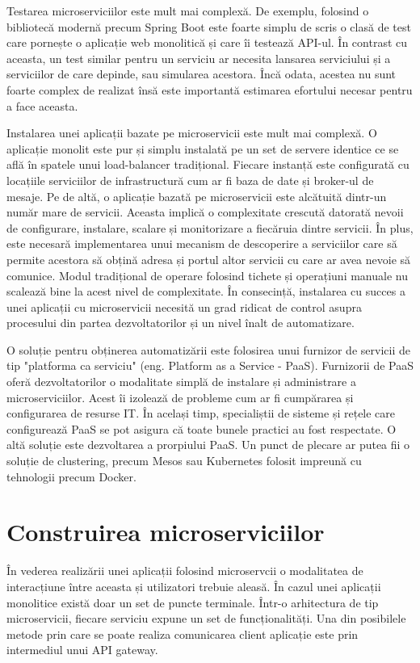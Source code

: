 \documentclass[12pt, a4paper, oneside, romanian]{teza-upb}
\begin{document}
Testarea microserviciilor este mult mai complexă. De exemplu, folosind o bibliotecă modernă precum Spring Boot este foarte simplu de scris o clasă de test care pornește o aplicație web monolitică și care îi testează API-ul. În contrast cu aceasta, un test similar pentru un serviciu ar necesita lansarea serviciului și a serviciilor de care depinde, sau simularea acestora. Încă odata, acestea nu sunt foarte complex de realizat însă este importantă estimarea efortului necesar pentru a face aceasta. 

Instalarea unei aplicații bazate pe microservicii este mult mai complexă. O aplicație monolit este pur și simplu instalată pe un set de servere identice ce se află în spatele unui load-balancer tradițional. Fiecare instanță este configurată cu locațiile serviciilor de infrastructură cum ar fi baza de date și broker-ul de mesaje. Pe de altă, o aplicație bazată pe microservicii este alcătuită dintr-un număr mare de servicii. Aceasta implică o complexitate crescută datorată nevoii de configurare, instalare, scalare și monitorizare a fiecăruia dintre servicii. În plus, este necesară implementarea unui mecanism de descoperire a serviciilor care să permite acestora să obțină adresa și portul altor servicii cu care ar avea nevoie să comunice. Modul tradițional de operare folosind tichete și operațiuni manuale nu scalează bine la acest nivel de complexitate. În consecință, instalarea cu succes a unei aplicații cu microservicii necesită un grad ridicat de control asupra procesului din partea dezvoltatorilor și un nivel înalt de automatizare. 

O soluție pentru obținerea automatizării este folosirea unui furnizor de servicii de tip "platforma ca serviciu" (eng. Platform as a Service - PaaS). Furnizorii de PaaS oferă dezvoltatorilor o modalitate simplă de instalare și administrare a microserviciilor. Acest îi izolează de probleme cum ar fi cumpărarea și configurarea de resurse IT. În același timp, specialiștii de sisteme și rețele care configurează PaaS se pot asigura că toate bunele practici au fost respectate. O altă soluție este dezvoltarea a prorpiului PaaS. Un punct de plecare ar putea fii o soluție de clustering, precum Mesos sau Kubernetes folosit impreună cu tehnologii precum Docker. 


\section{Construirea microserviciilor}

În vederea realizării unei aplicații folosind microservcii o modalitatea de interacțiune între aceasta și utilizatori trebuie aleasă. În cazul unei aplicații monolitice există doar un set de puncte terminale. Într-o arhitectura de tip microservicii, fiecare serviciu expune un set de funcționalități. Una din posibilele metode prin care se poate realiza comunicarea client aplicație este prin intermediul unui API gateway.
\end{document}
